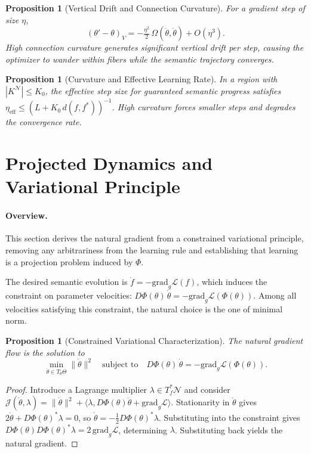 \documentclass[twocolumn,10pt]{article}
\theoremstyle{thmstyle}
\newtheorem{proposition}[theorem]{Proposition}
\theoremstyle{defstyle}
\begin{document}
\begin{proposition}[Vertical Drift and Connection Curvature]
For a gradient step of size $\eta$,
\[
(\theta' - \theta)_V =
-\tfrac{\eta^2}{2}\,\Omega(\dot\theta,\dot\theta) + O(\eta^3).
\]
High connection curvature generates significant vertical drift per step,
causing the optimizer to wander within fibers while the semantic
trajectory converges.
\end{proposition}

\begin{proposition}[Curvature and Effective Learning Rate]
In a region with $|K^\mathcal{N}| \leq K_0$, the effective step size
for guaranteed semantic progress satisfies
$\eta_{\mathrm{eff}} \leq (L + K_0\,d(f,f^*))^{-1}$.
High curvature forces smaller steps and degrades the convergence rate.
\end{proposition}

\section{Projected Dynamics and Variational Principle}
\label{sec:projected}

\paragraph{Overview.}
This section derives the natural gradient from a constrained variational
principle, removing any arbitrariness from the learning rule and
establishing that learning is a projection problem induced by $\Phi$.

The desired semantic evolution is $\dot f = -\mathrm{grad}_g\mathcal{L}(f)$,
which induces the constraint on parameter velocities:
$D\Phi(\theta)\,\dot\theta = -\mathrm{grad}_g\mathcal{L}(\Phi(\theta))$.
Among all velocities satisfying this constraint, the natural choice is
the one of minimal norm.

\begin{proposition}[Constrained Variational Characterization]
\label{prop:variational}
The natural gradient flow is the solution to
\[
\min_{\dot\theta \in T_\theta\Theta} \|\dot\theta\|^2
\quad \text{subject to} \quad
D\Phi(\theta)\,\dot\theta = -\mathrm{grad}_g\mathcal{L}(\Phi(\theta)).
\]
\end{proposition}

\begin{proof}
Introduce a Lagrange multiplier $\lambda \in T_f^*\mathcal{N}$ and
consider $\mathcal{J}(\dot\theta,\lambda) = \|\dot\theta\|^2 +
\langle\lambda, D\Phi(\theta)\dot\theta + \mathrm{grad}_g\mathcal{L}\rangle$.
Stationarity in $\dot\theta$ gives
$2\dot\theta + D\Phi(\theta)^*\lambda = 0$, so
$\dot\theta = -\tfrac{1}{2}D\Phi(\theta)^*\lambda$.
Substituting into the constraint gives
$D\Phi(\theta)D\Phi(\theta)^*\lambda = 2\,\mathrm{grad}_g\mathcal{L}$,
determining $\lambda$. Substituting back yields the natural gradient.
\end{proof}
\end{document}
